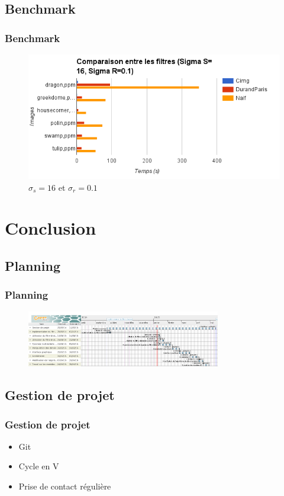 \documentclass[compress]{beamer}
\begin{document}
\subsection{Benchmark}
\begin{frame}\frametitle{Benchmark}

\begin{figure}
	\center
	\includegraphics[scale=0.4]{images/benchmarkFiltreS16R01.png}
	\caption{$\sigma_s=16$ et $\sigma_r=0.1$}
\end{figure}	
\end{frame}

\section{Conclusion}
\subsection*{Planning}
\begin{frame}\frametitle{Planning}
	\begin{figure}
	\center
	\includegraphics[width=320px]{images/Gantt.png}
\end{figure}
\end{frame}

\subsection*{Gestion de projet}
\begin{frame}\frametitle{Gestion de projet}
	\begin{block}{}
		\begin{itemize}
			\item Git
			\item Cycle en V
			\item Prise de contact régulière 
		\end{itemize}
	\end{block}

\end{frame}
\end{document}
